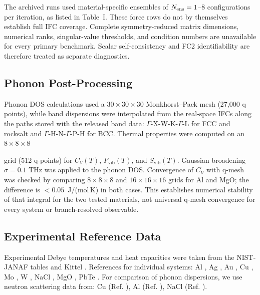 \documentclass[aps,prb,reprint,amsmath,amssymb,floatfix]{revtex4-2}
\begin{document}
\color{revisionblue}
The archived runs used material-specific ensembles of
\(N_{\rm ens}=1\)--8 configurations per iteration, as listed in Table~I.
These force rows do not by themselves establish full IFC coverage. Complete
symmetry-reduced matrix dimensions, numerical ranks, singular-value thresholds,
and condition numbers are unavailable for every primary benchmark. Scalar
self-consistency and FC2 identifiability are therefore treated as separate
diagnostics.
\color{black}

\subsection{Phonon Post-Processing}\label{phonon-post-processing}

\color{revisionblue}
Phonon DOS calculations used a \(30\times30\times30\) Monkhorst--Pack mesh
(27,000 q points), while band dispersions were interpolated from the real-space
IFCs along the paths stored with the released band data:
\(\Gamma\)-X-W-K-\(\Gamma\)-L for FCC and rocksalt and
\(\Gamma\)-H-N-\(\Gamma\)-P-H for BCC. Thermal properties were computed on an
\(8\times8\times8\)
\color{black}

\color{revisionblue}
grid (512 q-points) for \(C_V(T)\), \(F_\text{vib}(T)\), and
\(S_\text{vib}(T)\). Gaussian broadening \(\sigma = 0.1\) THz was
applied to the phonon DOS. Convergence of \(C_V\) with q-mesh was checked by
comparing \(8\times8\times8\) and \(16\times16\times16\) grids for Al and MgO;
the difference is \(<0.05\)~J/(mol\,K) in both cases. This establishes numerical
stability of that integral for the two tested materials, not universal q-mesh
convergence for every system or branch-resolved observable.
\color{black}

\subsection{Experimental Reference
Data}\label{experimental-reference-data}

\color{revisionblue}
Experimental Debye temperatures and heat capacities were taken from the
NIST-JANAF tables \cite{ref20} and Kittel \cite{ref21}. References for
individual systems: Al \cite{ref22}, Ag \cite{ref25}, Au
\cite{ref23}, Cu \cite{ref24,ref33}, Mo \cite{ref26}, W \cite{ref27},
NaCl \cite{ref28}, MgO \cite{ref29,ref30}, PbTe \cite{ref31,ref32}. For
comparison of phonon dispersions, we use neutron scattering data from:
Cu (Ref. \cite{ref33}), Al (Ref. \cite{ref34}), NaCl (Ref.
\cite{ref35}).
\color{black}
\end{document}

